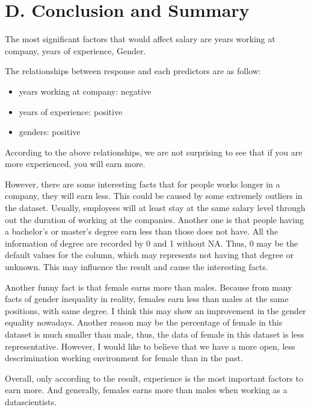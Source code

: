 \documentclass[
]{article}
\begin{document}
\hypertarget{d.-conclusion-and-summary}{%
\section{D. Conclusion and Summary}\label{d.-conclusion-and-summary}}

The most significant factors that would affect salary are years working
at company, years of experience, Gender.

The relationships between response and each predictors are as follow:

\begin{itemize}
\item
  years working at company: negative
\item
  years of experience: positive
\item
  genders: positive
\end{itemize}

According to the above relationships, we are not surprising to see that
if you are more experienced, you will earn more.

However, there are some interesting facts that for people works longer
in a company, they will earn less. This could be caused by some
extremely outliers in the dataset. Usually, employees will at least stay
at the same salary level through out the duration of working at the
companies. Another one is that people having a bachelor's or master's
degree earn less than those does not have. All the information of degree
are recorded by 0 and 1 without NA. Thus, 0 may be the default values
for the column, which may represents not having that degree or unknown.
This may influence the result and cause the interesting facts.

Another funny fact is that female earns more than males. Because from
many facts of gender inequality in reality, females earn less than males
at the same positions, with same degree. I think this may show an
improvement in the gender equality nowadays. Another reason may be the
percentage of female in this dataset is much smaller than male, thus,
the data of female in this dataset is less representative. However, I
would like to believe that we have a more open, less descrimination
working environment for female than in the past.

Overall, only according to the result, experience is the most important
factors to earn more. And generally, females earns more than males when
working as a datascientists.

\newpage
\end{document}
